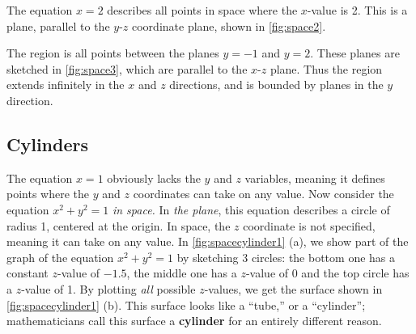 The equation $x=2$ describes all points in space where the $x$-value is 2. This is a plane, parallel to the $y$-$z$ coordinate plane, shown in \autoref{fig:space2}.


{%
%
The region is all points between the planes $y=-1$ and $y=2$. These planes are sketched in \autoref{fig:space3}, which are parallel to the $x$-$z$ plane. Thus the region extends infinitely in the $x$ and $z$ directions, and is bounded by planes in the $y$ direction.}


\subsection*{Cylinders}

The equation $x=1$ obviously lacks the $y$ and $z$ variables, meaning it defines points where the $y$ and $z$ coordinates can take on any value. Now consider the equation $x^2+y^2=1$ \emph{in space.} In \emph{the plane}, this equation describes a circle of radius 1, centered at the origin. In space, the $z$ coordinate is not specified, meaning it can take on any value. In \autoref{fig:spacecylinder1} (a), we show part of the graph of the equation $x^2+y^2=1$ by sketching 3 circles: the bottom one has a constant $z$-value of $-1.5$, the middle one has a $z$-value of 0 and the top circle has a $z$-value of 1. By plotting \emph{all} possible $z$-values, we get the  surface shown in \autoref{fig:spacecylinder1} (b). This surface looks like a ``tube,'' or a ``cylinder''; mathematicians call this surface a \textbf{cylinder} for an entirely different reason.



